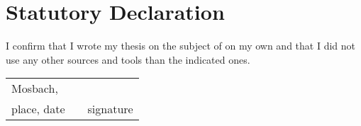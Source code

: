 \chapter*{Statutory Declaration}

\begin{justify}
	\large I confirm that I wrote my thesis on the subject of \kursiv{\title} on my own and that I did not use any other sources and tools than the indicated ones.
	
	\vspace{15pt}
	
	
	\vspace{25pt}
	
	\noindent 
	\begin{tabular}{lp{2em}l}
		
		Mosbach, \abgabe  && \hspace{6cm} \\\cline{1-1}\cline{3-3}
		
		place, date     && signature
		
	\end{tabular}
	
\end{justify}